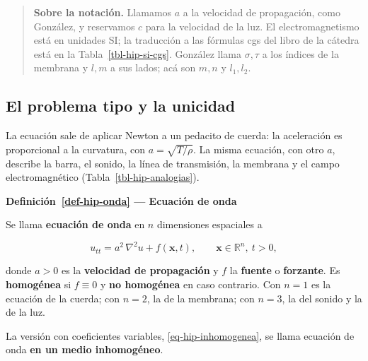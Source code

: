 \documentclass[
  spanish,
  a4paper,
]{scrbook}
\theoremstyle{definition}
\theoremstyle{plain}
\theoremstyle{definition}
\theoremstyle{plain}
\theoremstyle{definition}
\theoremstyle{remark}
\begin{document}
\begin{quote}
\textbf{Sobre la notación.} Llamamos \(a\) a la velocidad de
propagación, como González, y reservamos \(c\) para la velocidad de la
luz. El electromagnetismo está en unidades SI; la traducción a las
fórmulas cgs del libro de la cátedra está en la
Tabla~\ref{tbl-hip-si-cgs}. González llama \(\sigma,\tau\) a los índices
de la membrana y \(l,m\) a sus lados; acá son \(m,n\) y \(l_1,l_2\).
\end{quote}

\subsection{El problema tipo y la unicidad}\label{sec-hip-resumen-1}

La ecuación sale de aplicar Newton a un pedacito de cuerda: la
aceleración es proporcional a la curvatura, con \(a = \sqrt{T/\rho}\).
La misma ecuación, con otro \(a\), describe la barra, el sonido, la
línea de transmisión, la membrana y el campo electromagnético
(Tabla~\ref{tbl-hip-analogias}).

\begin{tcolorbox}[enhanced jigsaw, arc=.35mm, bottomrule=.15mm, breakable, colback=white, colframe=quarto-callout-note-color-frame, left=2mm, leftrule=.75mm, opacityback=0, rightrule=.15mm, toprule=.15mm]
\begin{minipage}[t]{5.5mm}
\textcolor{quarto-callout-note-color}{\faInfo}
\end{minipage}%
\begin{minipage}[t]{\textwidth - 5.5mm}

\vspace{-3mm}\textbf{Definición~\ref{def-hip-onda} --- Ecuación de onda}\vspace{3mm}

Se llama \textbf{ecuación de onda} en \(n\) dimensiones espaciales a

\[
u_{tt} = a^2\,\nabla^2 u + f(\mathbf{x},t), \qquad \mathbf{x}\in\mathbb{R}^n,\ t>0,
\]

donde \(a>0\) es la \textbf{velocidad de propagación} y \(f\) la
\textbf{fuente} o \textbf{forzante}. Es \textbf{homogénea} si
\(f\equiv0\) y \textbf{no homogénea} en caso contrario. Con \(n=1\) es
la ecuación de la cuerda; con \(n=2\), la de la membrana; con \(n=3\),
la del sonido y la de la luz.

La versión con coeficientes variables, \ref{eq-hip-inhomogenea}, se
llama ecuación de onda \textbf{en un medio inhomogéneo}.

\end{minipage}%
\end{tcolorbox}
\end{document}
